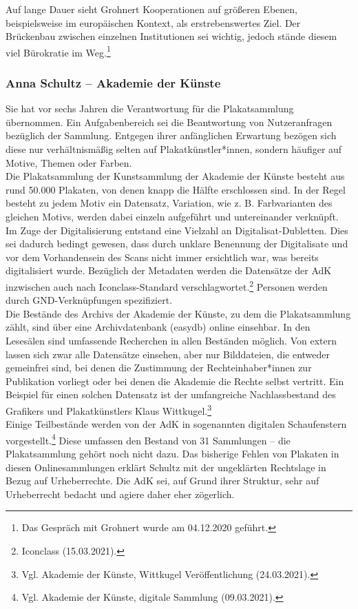\documentclass[a4paper,12pt,ngerman]{article}
\begin{document}
Auf lange Dauer sieht Grohnert Kooperationen auf größeren Ebenen, beispielsweise im europäischen Kontext, als erstrebenswertes Ziel. Der Brückenbau zwischen einzelnen Institutionen sei wichtig, jedoch stände diesem viel Bürokratie im Weg.\footnote{Das Gespräch mit Grohnert wurde am 04.12.2020 geführt.} \\

\subsubsection{Anna Schultz -- Akademie der Künste}
Sie hat vor sechs Jahren die Verantwortung für die Plakatsammlung übernommen. Ein Aufgabenbereich sei die Beantwortung von Nutzeranfragen bezüglich der Sammlung. Entgegen ihrer anfänglichen Erwartung bezögen sich diese nur verhältnismäßig selten auf Plakatkünstler*innen, sondern häufiger auf Motive, Themen oder Farben. \\
Die Plakatsammlung der Kunstsammlung der Akademie der Künste besteht aus rund 50.000 Plakaten, von denen knapp die Hälfte erschlossen sind. In der Regel besteht zu jedem Motiv ein Datensatz, Variation, wie z. B. Farbvarianten des gleichen Motivs, werden dabei einzeln aufgeführt und untereinander verknüpft. Im Zuge der Digitalisierung entstand eine Vielzahl an Digitalisat-Dubletten. Dies sei dadurch bedingt gewesen, dass durch unklare Benennung der Digitalisate und vor dem Vorhandensein des Scans nicht immer ersichtlich war, was bereits digitalisiert wurde. Bezüglich der Metadaten werden die Datensätze der AdK inzwischen auch nach Iconclass-Standard verschlagwortet.\footnote{Iconclass (15.03.2021).} Personen werden durch GND-Verknüpfungen spezifiziert. \\
Die Bestände des Archivs der Akademie der Künste, zu dem die Plakatsammlung zählt, sind über eine Archivdatenbank (easydb) online einsehbar. In den Lesesälen sind umfassende Recherchen in allen Beständen möglich. Von extern lassen sich zwar alle Datensätze einsehen, aber nur Bilddateien, die entweder gemeinfrei sind, bei denen die Zustimmung der Rechteinhaber*innen zur Publikation vorliegt oder bei denen die Akademie die Rechte selbst vertritt. Ein Beispiel für einen solchen Datensatz ist der umfangreiche Nachlassbestand des Grafikers und Plakatkünstlers Klaus Wittkugel.\footnote{Vgl. Akademie der Künste, Wittkugel Veröffentlichung (24.03.2021).} \\
Einige Teilbestände werden von der AdK in sogenannten digitalen Schaufenstern vorgestellt.\footnote{Vgl. Akademie der Künste, digitale Sammlung (09.03.2021).} Diese umfassen den Bestand von 31 Sammlungen -- die Plakatsammlung gehört noch nicht dazu. Das bisherige Fehlen von Plakaten in diesen Onlinesammlungen erklärt Schultz mit der ungeklärten Rechtslage in Bezug auf Urheberrechte. Die AdK sei, auf Grund ihrer Struktur, sehr auf Urheberrecht bedacht und agiere daher eher zögerlich. \\
\end{document}
